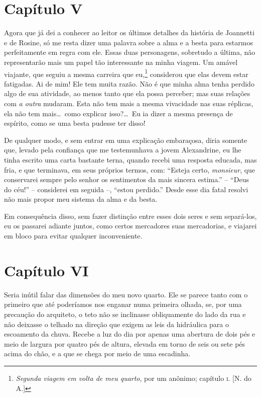 \section{Capítulo V}

 Agora que já dei a conhecer ao leitor os últimos detalhes da história
de Joannetti e de Rosine, só me resta dizer uma palavra sobre a alma e
a besta para estarmos perfeitamente em regra com ele. Essas duas
personagens, sobretudo a última, não representarão mais um papel tão
interessante na minha viagem. Um amável viajante, que seguiu a mesma
carreira que eu,\footnote{ \textit{Segunda viagem em volta de meu
quarto}, por um anônimo; capítulo \textsc{i}. [N. do A.]} considerou que elas devem
estar fatigadas. Ai de mim! Ele tem muita razão. Não é que minha alma
tenha perdido algo de sua atividade, ao menos tanto que ela possa
perceber; mas suas relações com \textit{a outra} mudaram. Esta não tem
mais a mesma vivacidade nas suas réplicas, ela não tem mais\ldots\ como
explicar isso?\ldots\ Eu ia dizer a mesma presença de espírito, como se uma
besta pudesse ter disso!

 De qualquer modo, e sem entrar em uma explicação embaraçosa, diria
somente que, levado pela confiança que me testemunhava a jovem
Alexandrine, eu lhe tinha escrito uma carta bastante terna, quando
recebi uma resposta educada, mas fria, e que terminava, em seus
próprios termos, com: ``Esteja certo, \textit{monsieur}, que conservarei
sempre pelo senhor os sentimentos da mais sincera estima.'' -- ``Deus do
céu!'' -- considerei em seguida --, ``estou perdido.'' Desde esse dia fatal
resolvi não mais propor meu sistema da alma e da besta. 

 Em consequência disso, sem fazer distinção entre esses dois seres e sem
separá-los, eu os passarei adiante juntos, como certos mercadores suas
mercadorias, e viajarei em bloco para evitar qualquer inconveniente. 

\section{Capítulo VI}

 Seria inútil falar das dimensões do meu novo quarto. Ele se parece
tanto com o primeiro que até poderíamos nos enganar numa primeira olhada,                    %
se, por uma precaução do arquiteto, o teto não se inclinasse
obliquamente do lado da rua e não deixasse o telhado na direção que
exigem as leis da hidráulica para o escoamento da chuva. Recebe a luz
do dia por apenas uma abertura de dois pés e meio de largura por quatro
pés de altura, elevada em torno de seis ou sete pés acima do chão, e a
que se chega por meio de uma escadinha.

